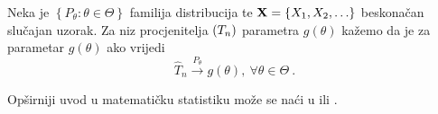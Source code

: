 \begin{defn}
	Neka je $\left\{ P_\theta: \theta \in \Theta \right\}$
	familija distribucija te $\tsvek{X} = \left\{ \tsvar{X}_1,\tsvar{X}_2,\ldots \right\}$
	beskonačan slučajan uzorak.
	Za niz procjenitelja $(\tsvar{T}_{n})$ parametra $g(\theta)$ kažemo da je 
	za parametar $g(\theta)$ ako vrijedi
	\[
		\hat{T}_{n} \overset{P_\theta}{\longrightarrow} g(\theta), \ 
		\forall \theta \in \Theta \ .
	\]
\end{defn}


\noindent
Opširniji uvod u matematičku statistiku može se naći u
\textcite{pausestatistika} ili \textcite{schervish_theory_1995}.
